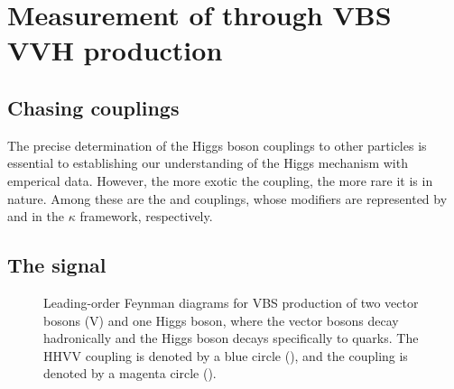 \chapter{Measurement of \kVV through VBS VVH production}\label{ch:vbsvvh}

\section{Chasing couplings}
The precise determination of the Higgs boson couplings to other particles is essential to establishing our understanding of the Higgs mechanism with emperical data. 
However, the more exotic the coupling, the more rare it is in nature. 
Among these are the \HHVV and \HHH couplings, whose modifiers are represented by \kVV and \kHHH in the $\kappa$ framework, respectively. 

\section{The signal}
\begin{figure}[htb]
    \centering
    \quad
    \quad
    \caption{
        Leading-order Feynman diagrams for VBS production of two vector bosons (V) and one Higgs boson, where the vector bosons decay hadronically and the Higgs boson decays specifically to \PQb quarks. 
        The HHVV coupling \kVV is denoted by a blue circle (\textcolor{blue}{}), and the \HHH coupling \kHHH is denoted by a magenta circle (\textcolor{magenta}{}). 
    }
    \label{fig:vbsvvh_feynman_allhad}
\end{figure}

